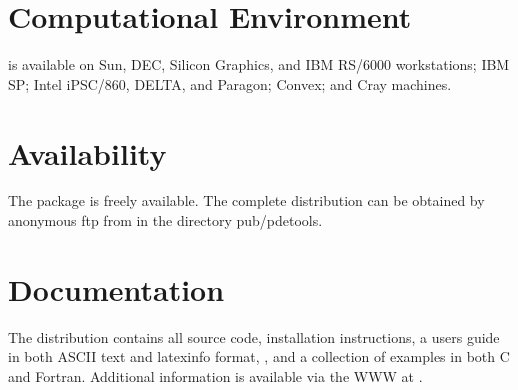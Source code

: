 \section*{Computational Environment}
 is available on Sun, DEC, Silicon Graphics, and IBM
RS/6000 workstations; IBM SP; Intel iPSC/860, DELTA, and Paragon;
Convex; and Cray machines.

\section*{Availability}

The  package is freely available.
The complete distribution can be obtained by anonymous ftp from 
 in the directory pub/pdetools.  

\section*{Documentation}

The  distribution contains all source code, 
installation instructions,
a users guide in both ASCII text and latexinfo format, 
,
and a collection of examples in both C and Fortran.  
Additional information is available via the WWW at
.

\makeinfo

